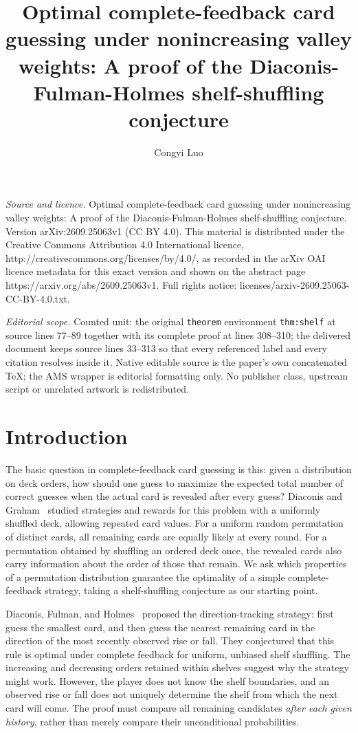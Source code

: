 \documentclass[10pt,a4paper]{amsart}
\numberwithin{equation}{section}
\begin{document}
\title[Optimal complete-feedback card guessing under nonincreasing ]{Optimal complete-feedback card guessing under nonincreasing valley weights: A proof of the Diaconis-Fulman-Holmes shelf-shuffling conjecture}
\author{Congyi Luo}
\date{}
\maketitle
\noindent\emph{Source and licence.} Optimal complete-feedback card guessing under nonincreasing valley weights: A proof of the Diaconis-Fulman-Holmes shelf-shuffling conjecture. Version arXiv:2609.25063v1 (CC BY 4.0). This material is distributed under the Creative Commons Attribution 4.0 International licence, http://creativecommons.org/licenses/by/4.0/, as recorded in the arXiv OAI licence metadata for this exact version and shown on the abstract page https://arxiv.org/abs/2609.25063v1. Full rights notice: licenses/arxiv-2609.25063-CC-BY-4.0.txt.\par\smallskip
\noindent\textit{Editorial scope.} Counted unit: the original \texttt{theorem} environment \texttt{thm:shelf} at source lines 77--89 together with its complete proof at lines 308--310; the delivered document keeps source lines 33--313 so that every referenced label and every citation resolves inside it. Native editable source is the paper's own concatenated TeX; the AMS wrapper is editorial formatting only. No publisher class, upstream script or unrelated artwork is redistributed.
\section{Introduction}
The basic question in complete-feedback card guessing is this: given a distribution on deck orders, how should one guess to maximize the expected total number of correct guesses when the actual card is revealed after every guess? Diaconis and Graham~\cite[Section 2]{DG} studied strategies and rewards for this problem with a uniformly shuffled deck, allowing repeated card values. For a uniform random permutation of distinct cards, all remaining cards are equally likely at every round. For a permutation obtained by shuffling an ordered deck once, the revealed cards also carry information about the order of those that remain. We ask which properties of a permutation distribution guarantee the optimality of a simple complete-feedback strategy, taking a shelf-shuffling conjecture as our starting point.

Diaconis, Fulman, and Holmes~\cite[Section 5.1]{DFH} proposed the direction-tracking strategy: first guess the smallest card, and then guess the nearest remaining card in the direction of the most recently observed rise or fall. They conjectured that this rule is optimal under complete feedback for uniform, unbiased shelf shuffling. The increasing and decreasing orders retained within shelves suggest why the strategy might work. However, the player does not know the shelf boundaries, and an observed rise or fall does not uniquely determine the shelf from which the next card will come. The proof must compare all remaining candidates \emph{after each given history}, rather than merely compare their unconditional probabilities.
\end{document}
